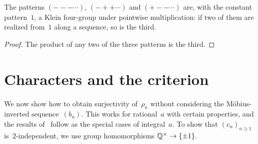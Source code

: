 \begin{lemma}
  \label{lem:klein}
  \leanok
  The patterns $({-}{-}{-}\cdots)$, $({-}{+}{+}\cdots)$ and $({+}{-}{-}\cdots)$ are, with the
  constant pattern~$1$, a Klein four-group under pointwise multiplication: if two of them are
  realized from~$1$ along a sequence, so is the third.
\end{lemma}
\begin{proof}
  \leanok
  The product of any two of the three patterns is the third.
\end{proof}

\section{Characters and the criterion}
\paperitems

We now show how to obtain surjectivity of~$\rho_a$ without considering the Möbius-inverted
sequence~$(b_n)$. This works for rational~$a$ with certain properties, and the results
of~\cite{paper, li2020, li2021} follow as the special cases of integral~$a$. To show that
$(c_n)_{n \ge 1}$ is~$2$-independent, we use group homomorphisms $\mathbb{Q}^\times \to \{\pm 1\}$.

